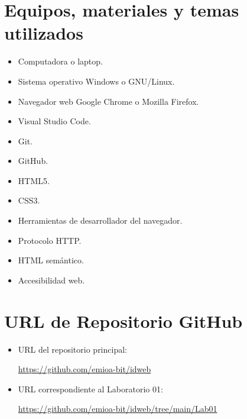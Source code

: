 \documentclass{article}
\begin{document}
\section{Equipos, materiales y temas utilizados}

\begin{itemize}

    \item Computadora o laptop.

    \item Sistema operativo Windows o GNU/Linux.

    \item Navegador web Google Chrome o Mozilla Firefox.

    \item Visual Studio Code.

    \item Git.

    \item GitHub.

    \item HTML5.

    \item CSS3.

    \item Herramientas de desarrollador del navegador.

    \item Protocolo HTTP.

    \item HTML semántico.

    \item Accesibilidad web.

\end{itemize}


\section{URL de Repositorio GitHub}

\begin{itemize}

    \item URL del repositorio principal:

    \url{https://github.com/emioa-bit/idweb}

    \item URL correspondiente al Laboratorio 01:

    \url{https://github.com/emioa-bit/idweb/tree/main/Lab01}

\end{itemize}
\end{document}
